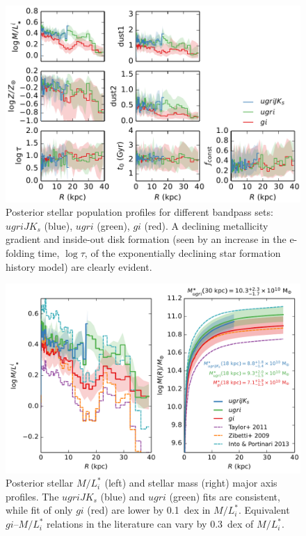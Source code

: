 \documentclass{iau}
\begin{document}
\begin{figure}
\centering
\includegraphics[width=0.7\columnwidth]{figure1} 
\caption{Posterior stellar population profiles for different bandpass sets: $ugriJK_s$ (blue), $ugri$ (green), $gi$ (red).
A declining metallicity gradient and inside-out disk formation (seen by an increase in the e-folding time, $\log \tau$, of the exponentially declining star formation history model) are clearly evident.}
\label{fig:pop_profile}
\end{figure}

\begin{figure}
\centering
\includegraphics[width=0.7\columnwidth]{figure2} 
\caption{Posterior stellar $M/L_i^*$ (left) and stellar mass (right) major axis profiles.
The $ugriJK_s$ (blue) and $ugri$ (green) fits are consistent, while fit of only $gi$ (red) are lower by 0.1~dex in $M/L_i^*$.
Equivalent $gi$--$M/L_i^*$ relations in the literature can vary by 0.3~dex of $M/L_i^*$.}
\label{fig:mass_profile}
\end{figure}
\end{document}

